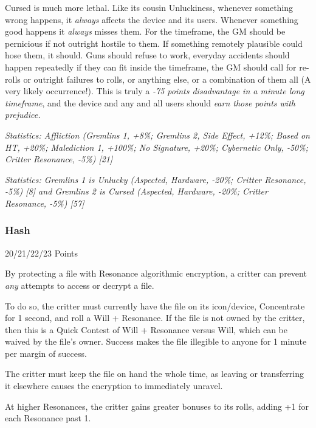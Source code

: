 \begin{multicols*}{3}
	Cursed is much more lethal. Like its cousin Unluckiness, whenever something wrong happens, it \textit{always} affects the device and its users. Whenever something good happens it \textit{always} misses them. For the timeframe, the GM should be pernicious if not outright hostile to them. If something remotely plausible could hose them, it should. Guns should refuse to work, everyday accidents should happen repeatedly if they can fit inside the timeframe, the GM should call for re-rolls or outright failures to rolls, or anything else, or a combination of them all (A very likely occurrence!). This is truly a \textit{-75 points disadvantage in a minute long timeframe}, and the device and any and all users should \textit{earn those points with prejudice.}

	\textcolor{OliveGreen}{\textit{Statistics: Affliction (Gremlins 1, +8\%; Gremlins 2, Side Effect, +12\%; Based on HT, +20\%; Malediction 1, +100\%; No Signature, +20\%; Cybernetic Only, -50\%; Critter Resonance, -5\%) [21]}}
	
	\textcolor{OliveGreen}{\textit{Statistics: Gremlins 1 is Unlucky (Aspected, Hardware, -20\%; Critter Resonance, -5\%) [8] and Gremlins 2 is Cursed (Aspected, Hardware, -20\%; Critter Resonance, -5\%) [57]}}

	\subsubsection{Hash}\label{hash}
	\begin{flushright}
		20/21/22/23 Points
	\end{flushright}

	By protecting a file with Resonance algorithmic encryption, a critter can prevent \textit{any} attempts to access or decrypt a file.
	
	To do so, the critter must currently have the file on its icon/device, Concentrate for 1 second, and roll a Will + Resonance. If the file is not owned by the critter, then this is a Quick Contest of Will + Resonance versus Will, which can be waived by the file's owner. Success makes the file illegible to anyone for 1 minute per margin of success.
	
	The critter must keep the file on hand the whole time, as leaving or transferring it elsewhere causes the encryption to immediately unravel.
	
	At higher Resonances, the critter gains greater bonuses to its rolls, adding +1 for each Resonance past 1.
	

\end{multicols*}
